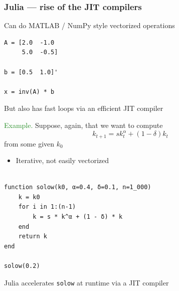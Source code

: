 \documentclass[
    xcolor={svgnames,dvipsnames},
    hyperref={colorlinks, citecolor=DeepPink4, linkcolor=DarkRed, urlcolor=DarkBlue}
    ]{beamer}  %
\newcommand{\Eg}{\textcolor{ForestGreen}{Example. }}
\newcommand{\1}{\mathbbm 1}
\begin{document}
\begin{frame}[fragile]
    \frametitle{Julia --- rise of the JIT compilers}

    Can do MATLAB / NumPy style vectorized operations

    \begin{verbatim}
A = [2.0  -1.0
     5.0  -0.5]

b = [0.5  1.0]'

x = inv(A) * b
    \end{verbatim}
    
\end{frame}


\begin{frame}
    
    But also has fast loops via an efficient JIT compiler

    \vspace{0.5em}
    \vspace{0.5em}
    \Eg Suppose, again, that we want to compute 
    \begin{equation*}
        k_{t+1} = s k_t^\alpha + (1 - \delta) k_t
    \end{equation*}
    from some given $k_0$ 


    \vspace{0.5em}
    \vspace{0.5em}
    \vspace{0.5em}
    \vspace{0.5em}
    \begin{itemize}
        \item Iterative, not easily vectorized
    \end{itemize}

\end{frame}


\begin{frame}[fragile]
    
    \begin{verbatim}

function solow(k0, α=0.4, δ=0.1, n=1_000)
    k = k0
    for i in 1:(n-1)
        k = s * k^α + (1 - δ) * k
    end
    return k
end

solow(0.2)
    \end{verbatim}

    \vspace{0.5em}
    \vspace{0.5em}
    \vspace{0.5em}
    \vspace{0.5em}

    Julia accelerates \texttt{solow} at runtime via a JIT compiler

\end{frame}
\end{document}
